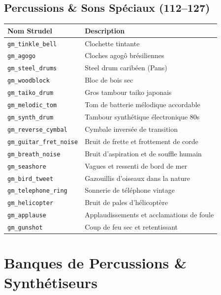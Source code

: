 \documentclass[a4paper,10pt]{article}
\begin{document}
\subsection{Percussions \& Sons Spéciaux (112--127)}
\begin{tabularx}{\linewidth}{|l|X|}
\hline
\textbf{Nom Strudel} & \textbf{Description} \\
\hline
\texttt{gm\_tinkle\_bell} & Clochette tintante \\
\texttt{gm\_agogo} & Cloches agogô brésiliennes \\
\texttt{gm\_steel\_drums} & Steel drum caribéen (Pans) \\
\texttt{gm\_woodblock} & Bloc de bois sec \\
\texttt{gm\_taiko\_drum} & Gros tambour taiko japonais \\
\texttt{gm\_melodic\_tom} & Tom de batterie mélodique accordable \\
\texttt{gm\_synth\_drum} & Tambour synthétique électronique 80s \\
\texttt{gm\_reverse\_cymbal} & Cymbale inversée de transition \\
\texttt{gm\_guitar\_fret\_noise} & Bruit de frette et frottement de corde \\
\texttt{gm\_breath\_noise} & Bruit d'aspiration et de souffle humain \\
\texttt{gm\_seashore} & Vagues et ressenti de bord de mer \\
\texttt{gm\_bird\_tweet} & Gazouillis d'oiseaux dans la nature \\
\texttt{gm\_telephone\_ring} & Sonnerie de téléphone vintage \\
\texttt{gm\_helicopter} & Bruit de pales d'hélicoptère \\
\texttt{gm\_applause} & Applaudissements et acclamations de foule \\
\texttt{gm\_gunshot} & Coup de feu sec et retentissant \\
\hline
\end{tabularx}

\newpage

\section{Banques de Percussions \& Synthétiseurs}
\end{document}
